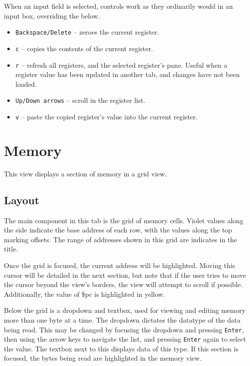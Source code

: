 \documentclass[10pt]{article}
\begin{document}
    When an input field is selected, controls work as they ordinarily would in an input box, overriding the below.

    \begin{itemize}
        \item \texttt{Backspace/Delete} -- zeroes the current register.
        \item \texttt{c} -- copies the contents of the current register.
        \item \texttt{r} -- refresh all registers, and the selected register's pane.
        Useful when a register value has been updated in another tab, and changes have not been loaded.
        \item \texttt{Up/Down arrows} -- scroll in the register list.
        \item \texttt{v} -- paste the copied register's value into the current register.
    \end{itemize}

    \section{Memory}

    This view displays a section of memory in a grid view.

    \subsection{Layout}

    The main component in this tab is the grid of memory cells.
    Violet values along the side indicate the base address of each row, with the values along the top marking offsets.
    The range of addresses shown in this grid are indicates in the title.

    Once the grid is focused, the current address will be highlighted.
    Moving this cursor will be detailed in the next section, but note that if the user tries to move the cursor beyond the view's borders, the view will attempt to scroll if possible.
    Additionally, the value of \$pc is highlighted in yellow.

    Below the grid is a dropdown and textbox, used for viewing and editing memory more than one byte at a time.
    The dropdown dictates the datatype of the data being read.
    This may be changed by focusing the dropdown and pressing \texttt{Enter}, then using the arrow keys to navigate the list, and pressing \texttt{Enter} again to select the value.
    The textbox next to this displays data of this type.
    If this section is focused, the bytes being read are highlighted in the memory view.
\end{document}
